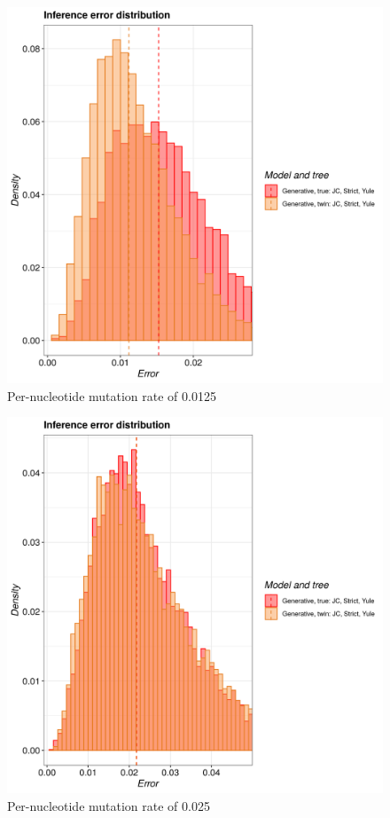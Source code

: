 \begin{figure}[H]
  \includegraphics[width=\textwidth]{pirouette_example_24/example_24_314/errors.png}
  \caption{Per-nucleotide mutation rate of 0.0125}
\end{figure}


\begin{figure}[H]
  \includegraphics[width=\textwidth]{pirouette_example_24/example_24_315/errors.png}
  \caption{Per-nucleotide mutation rate of 0.025}
\end{figure}

